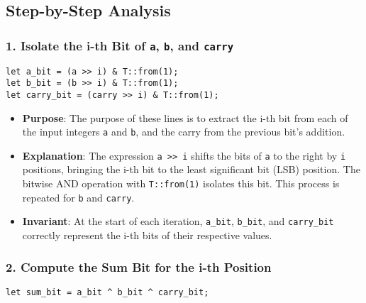 \documentclass{article}
\begin{document}
\subsection*{Step-by-Step Analysis}

\subsubsection*{1. Isolate the i-th Bit of \texttt{a}, \texttt{b}, and \texttt{carry}}

\begin{verbatim}
let a_bit = (a >> i) & T::from(1);
let b_bit = (b >> i) & T::from(1);
let carry_bit = (carry >> i) & T::from(1);
\end{verbatim}

\begin{itemize}
    \item \textbf{Purpose}: 
    The purpose of these lines is to extract the i-th bit from each of the input integers \texttt{a} and \texttt{b}, and the carry from the previous bit's addition.
    \item \textbf{Explanation}: 
    The expression \texttt{a >> i} shifts the bits of \texttt{a} to the right by \texttt{i} positions, bringing the i-th bit to the least significant bit (LSB) position. The bitwise AND operation with \texttt{T::from(1)} isolates this bit. This process is repeated for \texttt{b} and \texttt{carry}.
    \item \textbf{Invariant}: 
    At the start of each iteration, \texttt{a\_bit}, \texttt{b\_bit}, and \texttt{carry\_bit} correctly represent the i-th bits of their respective values.
\end{itemize}

\subsubsection*{2. Compute the Sum Bit for the i-th Position}

\begin{verbatim}
let sum_bit = a_bit ^ b_bit ^ carry_bit;
\end{verbatim}
\end{document}
